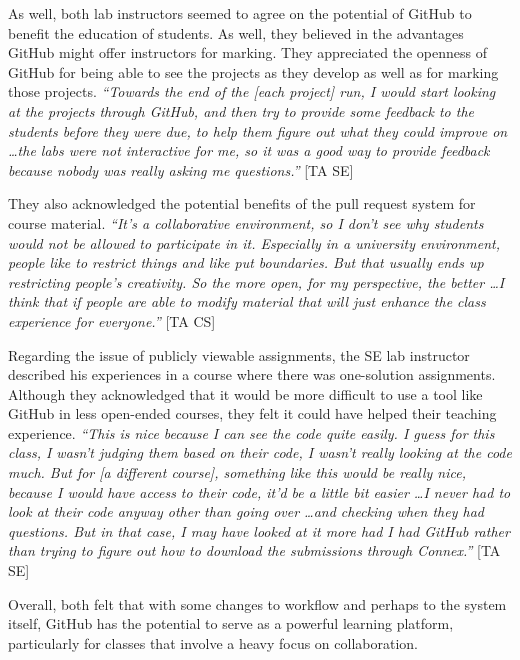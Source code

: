 As well, both lab instructors seemed to agree on the potential of GitHub to benefit the education of students. As well, they believed in the advantages GitHub might offer instructors for marking. They appreciated the openness of GitHub for being able to see the projects as they develop as well as for marking those projects. \textit{``Towards the end of the [each project] run, I would start looking at the projects through GitHub, and then try to provide some feedback to the students before they were due, to help them figure out what they could improve on \ldots the labs were not interactive for me, so it was a good way to provide feedback because nobody was really asking me questions.''} [TA SE]

They also acknowledged the potential benefits of the pull request system for course material. \textit{``It's a collaborative environment, so I don't see why students would not be allowed to participate in it. Especially in a university environment, people like to restrict things and like put boundaries. But that usually ends up restricting people's creativity. So the more open, for my perspective, the better \ldots I think that if people are able to modify material that will just enhance the class experience for everyone.''} [TA CS]

Regarding the issue of publicly viewable assignments, the SE lab instructor described his experiences in a course where there was one-solution assignments. Although they acknowledged that it would be more difficult to use a tool like GitHub in less open-ended courses, they felt it could have helped their teaching experience. \textit{``This is nice because I can see the code quite easily. I guess for this class, I wasn't judging them based on their code, I wasn't really looking at the code much. But for [a different course], something like this would be really nice, because I would have access to their code, it'd be a little bit easier \ldots I never had to look at their code anyway other than going over \ldots and checking when they had questions. But in that case, I may have looked at it more had I had GitHub rather than trying to figure out how to download the submissions through Connex.''} [TA SE]

Overall, both felt that with some changes to workflow and perhaps to the system itself, GitHub has the potential to serve as a powerful learning platform, particularly for classes that involve a heavy focus on collaboration.


